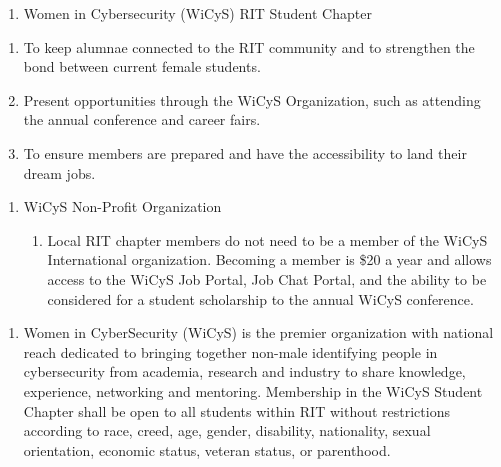 


\begin{enumerate}
	\item Women in Cybersecurity (WiCyS) RIT Student Chapter
\end{enumerate}


\begin{enumerate}
	\item To keep alumnae connected to the RIT community and to strengthen the bond between current female students.
      \item Present opportunities through the WiCyS Organization, such as attending the annual conference and career fairs. 
      \item To ensure members are prepared and have the accessibility to land their dream jobs. 
\end{enumerate}



\begin{enumerate}
	\item WiCyS Non-Profit Organization
	      \begin{enumerate}
		      \item Local RIT chapter members do not need to be a member of the WiCyS International organization. Becoming a member is \$20 a year and allows access to the WiCyS Job Portal, Job Chat Portal, and the ability to be considered for a student scholarship to the annual WiCyS conference.
            \end{enumerate}
\end{enumerate}


\begin{enumerate}
	\item Women in CyberSecurity (WiCyS) is the premier organization with national reach dedicated to bringing together non-male identifying people in cybersecurity from academia, research and industry to share knowledge, experience, networking and mentoring. Membership in the WiCyS Student Chapter shall be open to all students within RIT without restrictions according to race, creed, age, gender, disability, nationality, sexual orientation, economic status, veteran status, or parenthood.
\end{enumerate}

